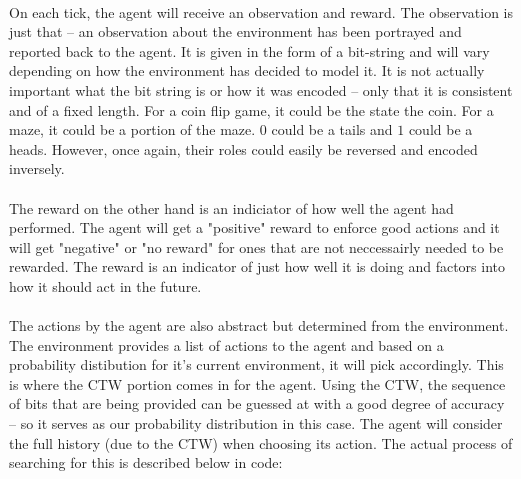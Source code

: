 \documentclass[fancychapters]{report}   	%
\begin{document}
\paragraph{}
\paragraph{}
On each tick, the agent will receive an observation and reward. The observation is just that -- an observation about the environment has been portrayed and reported back to the agent. It is given in the form of a bit-string and will vary depending on how the environment has decided to model it. It is not actually important what the bit string is or how it was encoded -- only that it is consistent and of a fixed length. For a coin flip game, it could be the state the coin. For a maze, it could be a portion of the maze. $0$ could be a tails and $1$ could be a heads. However, once again, their roles could easily be reversed and encoded inversely.
\paragraph{}
\paragraph{}
The reward on the other hand is an indiciator of how well the agent had performed. The agent will get a "positive" reward to enforce good actions and it will get "negative" or "no reward" for ones that are not neccessairly needed to be rewarded. The reward is an indicator of just how well it is doing and factors into how it should act in the future.
\paragraph{}
\paragraph{}
The actions by the agent are also abstract but determined from the environment. The environment provides a list of actions to the agent and based on a probability distibution for it's current environment, it will pick accordingly. This is where the CTW portion comes in for the agent. Using the CTW, the sequence of bits that are being provided can be guessed at with a good degree of accuracy -- so it serves as our probability distribution in this case. The agent will consider the full history (due to the CTW) when choosing its action. The actual process of searching for this is described below in code:
\end{document}
